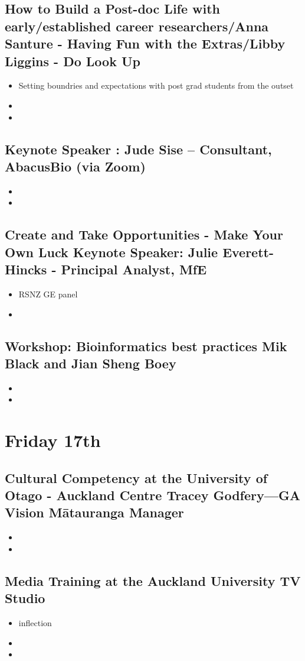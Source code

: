 \documentclass[document.tex]{subfiles}
\begin{document}
    \subsection{How to Build a Post-doc Life with early/established career researchers/Anna Santure - Having Fun with the Extras/Libby Liggins - Do Look Up}
    \begin{itemize}
    \item Setting boundries and expectations with post grad students from the outset
    \item 
    \item 
    \end{itemize}

    \subsection{Keynote Speaker : Jude Sise – Consultant, AbacusBio (via Zoom)}
    \begin{itemize}
    \item 
    \item 
    \end{itemize}

    \subsection{Create and Take Opportunities - Make Your Own Luck Keynote Speaker: Julie Everett-Hincks - Principal Analyst, MfE}
    \begin{itemize}
    \item RSNZ GE panel
    \item 
    \end{itemize}

    \subsection{Workshop: Bioinformatics best practices Mik Black and Jian Sheng Boey}
    \begin{itemize}
    \item 
    \item 
    \end{itemize}



\section*{Friday 17th}

    \subsection{Cultural Competency at the University of Otago - Auckland Centre Tracey Godfery—GA Vision Mātauranga Manager}
    \begin{itemize}
    \item 
    \item 
    \end{itemize}
    
    \subsection{Media Training at the Auckland University TV Studio}
    \begin{itemize}
    \item inflection
    \item 
    \item 
    \end{itemize}
    
    
\bib{}
    
\end{document}
